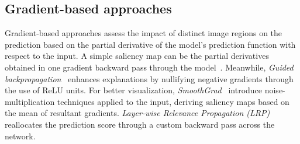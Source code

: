 \subsection{Gradient-based approaches}
Gradient-based approaches assess the impact of distinct image regions on the prediction based on the partial derivative of the model's prediction function with respect to the input. A simple saliency map can be the partial derivatives obtained in one gradient backward pass through the model~\cite{simonyan2013deep}. 
Meanwhile, \emph{Guided backpropagation}~\cite{guidedbackprop} enhances explanations by nullifying negative gradients through the use of ReLU units.
For better visualization, \emph{SmoothGrad}~\cite{smoothgrad} introduce noise-multiplication techniques applied to the input, deriving saliency maps based on the mean of resultant gradients.
\emph{Layer-wise Relevance Propagation (LRP)}~\cite{bach2015pixel} reallocates the prediction score through a custom backward pass across the network.%





